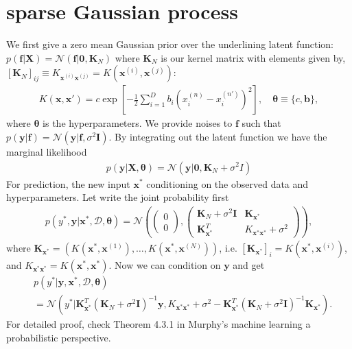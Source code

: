 \documentclass[10pt,a4paper]{article}
\begin{document}
\section{sparse Gaussian process}
We first give a zero mean Gaussian prior over the underlining latent function: $p(\pmb{f}|\pmb{X})=\mathcal{N}(\pmb{f}|\pmb{0},\pmb{K}_N)$ where $\pmb{K}_N$ is our kernel matrix with elements given by, $[\pmb{K}_N]_{ij}\equiv K_{\pmb{x}^{(i)}\pmb{x}^{(j)}}=K(\pmb{x}^{(i)},\pmb{x}^{(j)})$:
\begin{align}
K(\pmb{x},\pmb{x}')=c\exp [-\frac{1}{2}\sum_{i=1}^{D}b_i(x^{(n)}_i-x^{(n')}_i)^2], \quad\pmb{\theta}\equiv \lbrace c,\pmb{b}\rbrace,
\end{align}
where $\pmb{\theta}$ is the hyperparameters.
We provide noises to $\pmb{f}$ such that $p(\pmb{y}|\pmb{f})=\mathcal{N}(\pmb{y}|\pmb{f},\sigma^2\pmb{I})$. By integrating out the latent function we have the marginal likelihood
\begin{align}
p(\pmb{y}|\pmb{X},\pmb{\theta})=\mathcal{N}(\pmb{y}|\pmb{0},\pmb{K}_N+\sigma^2I)
\end{align}
For prediction, the new input $\pmb{x}^*$ conditioning on the observed data and hyperparameters. Let write the joint probability first
\begin{align}
p(y^*,\pmb{y}|\pmb{x}^*,\mathcal{D},\pmb{\theta})=\mathcal{N}\left(\begin{pmatrix}
0\\0
\end{pmatrix},\begin{pmatrix}
\pmb{K}_N+\sigma^2\pmb{I} & \pmb{K}_{\pmb{x}^*}\\
\pmb{K}_{\pmb{x}^*}^T & K_{\pmb{x}^*\pmb{x}^*}+\sigma^2
\end{pmatrix}\right),
\end{align}
where $\pmb{K}_{\pmb{x}^*}=(K(\pmb{x}^*,\pmb{x}^{(1)}),\dots,K(\pmb{x}^*,\pmb{x}^{(N)}))$, i.e. $[\pmb{K}_{\pmb{x}^*}]_{i}=K(\pmb{x}^*,\pmb{x}^{(i)})$, and $K_{\pmb{x}^*\pmb{x}^*}=K(\pmb{x}^*,\pmb{x}^*)$. 
Now we can condition on $\pmb{y}$ and get
\begin{align}
&p(y^*|\pmb{y},\pmb{x}^*,\mathcal{D},\pmb{\theta})\nonumber\\
&=\mathcal{N}(y^*|\pmb{K}_{\pmb{x}^*}^T(\pmb{K}_N+\sigma^2\pmb{I})^{-1}\pmb{y},K_{\pmb{x}^*\pmb{x}^*}+\sigma^2-\pmb{K}_{\pmb{x}^*}^T(\pmb{K}_N+\sigma^2\pmb{I})^{-1}\pmb{K}_{\pmb{x}^*}).
\end{align}
For detailed proof, check Theorem 4.3.1 in Murphy's machine learning a probabilistic perspective.
\end{document}
